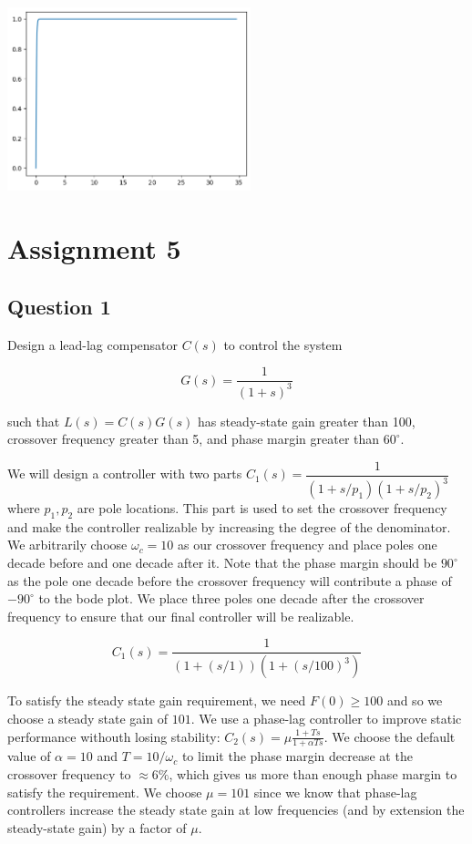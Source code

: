 \documentclass[11pt]{article}
\begin{document}
\includegraphics[width=200pt]{a4_9.png}

\section{Assignment 5}

\subsection{Question 1}

Design a lead-lag compensator $C(s)$ to control the system

\[ G(s) = \dfrac{1}{(1 + s)^3} \]


such that $L(s) = C(s)G(s)$ has steady-state gain greater than 100, crossover frequency greater than 5, and phase margin greater than $60^\circ$.

We will design a controller with two parts $C_1(s) = \dfrac{1}{(1 + s/p_1)(1 + s/p_2)^3}$ where $p_1, p_2$ are pole locations. This part is used to set the crossover frequency and make the controller realizable by increasing the degree of the denominator. We arbitrarily choose $\omega_c = 10$ as our crossover frequency and place poles one decade before and one decade after it. Note that the phase margin should be $90^\circ$ as the pole one decade before the crossover frequency will contribute a phase of $-90^\circ$ to the bode plot. We place three poles one decade after the crossover frequency to ensure that our final controller will be realizable.

\[ C_1(s) = \dfrac{1}{(1 + (s / 1)) (1 + (s / 100)^3)} \]

To satisfy the steady state gain requirement, we need $F(0) \geq 100$ and so we choose a steady state gain of $101$. We use a phase-lag controller to improve static performance withouth losing stability: $C_2(s) = \mu \frac{1 + T s}{1 + \alpha T s}$. We choose the default value of $\alpha = 10$ and $T = 10 / \omega_c$ to limit the phase margin decrease at the crossover frequency to $\approx 6\%$, which gives us more than enough phase margin to satisfy the requirement. We choose $\mu = 101$ since we know that phase-lag controllers increase the steady state gain at low frequencies (and by extension the steady-state gain) by a factor of $\mu$.
\end{document}
